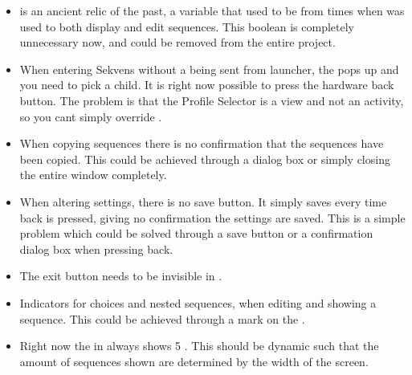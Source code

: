 \begin{itemize}
\item {} is an ancient relic of the past, a variable that used to be from times when  was used to both display and edit sequences. This boolean is completely unnecessary now, and could be removed from the entire project.
\item When entering Sekvens without a  being sent from launcher, the  pops up and you need to pick a child. It is right now possible to press the hardware back button. The problem is that the Profile Selector is a view and not an activity, so you cant simply override .
\item When copying sequences there is no confirmation that the sequences have been copied. This could be achieved through a dialog box or simply closing the entire window completely.
\item When altering settings, there is no save button. It simply saves every time back is pressed, giving no confirmation the settings are saved. This is a simple problem which could be solved through a save button or a confirmation dialog box when pressing back.
\item The exit button needs to be invisible in . 
\item Indicators for choices and nested sequences, when editing and showing a sequence. This could be achieved through a mark on the .
\item Right now the  in  always shows 5 . This should be dynamic such that the amount of sequences shown are determined by the width of the screen.
\end{itemize}

